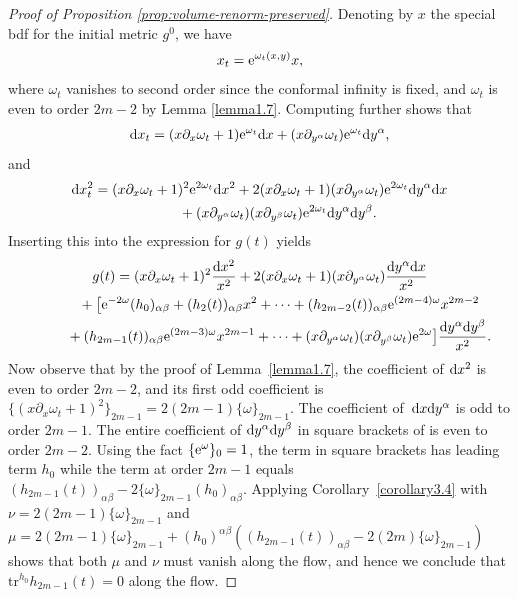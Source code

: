 \documentclass[pdftex]{sigma}
\numberwithin{equation}{section}
\newcommand{\gin}{{g^0}}
\newcommand{\tr}{\mathrm{tr}}
\begin{document}
\begin{proof}[Proof of Proposition \ref{prop:volume-renorm-preserved}]
Denoting by $x$ the special bdf for the initial metric $\gin$, we have
\begin{gather*}%
x_t = {\rm e}^{\omega_t(x,y)} x,
\end{gather*}
where $\omega_t$ vanishes to second order since the conformal infinity is fixed, and $\omega_t$ is even to order $2m-2$ by Lemma \ref{lemma1.7}.
Computing further shows that
\begin{gather*}%
{\rm d}x_t = (x\partial_x \omega_t + 1) {\rm e}^{\omega_t} {\rm d}x + (x \partial_{y^{\alpha}} \omega_t) {\rm e}^{\omega_t} {\rm d}y^{\alpha} ,
\end{gather*}
and
\begin{gather*}%
{\rm d}x_t^2 = (x\partial_x \omega_t + 1)^2 {\rm e}^{2\omega_t} {\rm d}x^2 + 2(x\partial_x \omega_t + 1) (x \partial_{y^{\alpha}} \omega_t)
{\rm e}^{2\omega_t} {\rm d}y^{\alpha} {\rm d}x\\
\hphantom{{\rm d}x_t^2 =}{} + (x \partial_{y^{\alpha}} \omega_t) (x \partial_{y^{\beta}} \omega_t) {\rm e}^{2\omega_t} {\rm d}y^{\alpha} {\rm d}y^{\beta}.
\end{gather*}
Inserting this into the expression for $g(t)$ yields
\begin{gather*}%
g(t) = ( x\partial_x \omega_t + 1)^2 \frac{{\rm d}x^2}{x^2} + 2( x\partial_x \omega_t + 1)( x \partial_{y^{\alpha}} \omega_t) \frac{{\rm d}y^{\alpha} {\rm d}x}{x^2} \\
\hphantom{g(t) =}{} + \big[ {\rm e}^{-2\omega} (h_0)_{\alpha \beta} + (h_2(t))_{\alpha \beta} x^2 + \cdots + (h_{2m-2}(t))_{\alpha \beta} {\rm e}^{(2m-4)\omega} x^{2m-2}\\
\hphantom{g(t) =}{} + (h_{2m-1}(t))_{\alpha \beta} {\rm e}^{(2m-3)\omega} x^{2m-1} + \cdots + (x \partial_{y^{\alpha}} \omega_t) (x \partial_{y^{\beta}} \omega_t) {\rm e}^{2\omega} \big] \frac{{\rm d}y^{\alpha} {\rm d}y^{\beta}}{x^2} .
\end{gather*}
Now observe that by the proof of Lemma~\ref{lemma1.7}, the coefficient of ${\rm d}x^2$ is even to order $2m-2$, and its first odd coefficient is $
\big\{ ( x\partial_x \omega_t + 1)^2 \big\}_{2m-1} = 2 (2m-1) \{\omega\}_{2m-1}$. The coefficient of~${\rm d}x {\rm d}y^{\alpha}$ is odd to order $2m-1$. The entire coefficient of ${\rm d}y^{\alpha} {\rm d}y^{\beta}$ in square brackets of is even to order $2m-2$. Using the fact $\{{\rm e}^{\omega}\}_0 = 1$, the term in square brackets has leading term $h_0$ while the term at order $2m-1$ equals $(h_{2m-1}(t))_{\alpha \beta} - 2 \{\omega\}_{2m-1}(h_0)_{\alpha \beta}$. Applying Corollary~\ref{corollary3.4} with $\nu = 2(2m-1) \{\omega\}_{2m-1}$ and $\mu = 2(2m-1) \{\omega\}_{2m-1} + (h_0)^{\alpha \beta}( (h_{2m-1}(t))_{\alpha \beta} - 2(2m)\{\omega\}_{2m-1}) $ shows that both $\mu$ and $\nu$ must vanish along the flow, and hence we conclude that $\tr^{h_0} h_{2m-1}(t) = 0$ along the flow.
\end{proof}
\end{document}
